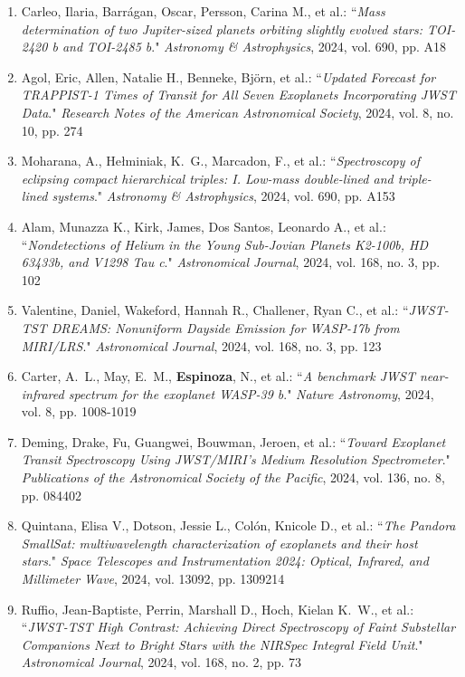 \documentclass[12pt, a4paper]{article} %
\begin{document}
\begin{flushleft}
\begin{enumerate}
\item Carleo, Ilaria, Barrágan, Oscar, Persson, Carina M., et al.: ``\textit{Mass determination of two Jupiter-sized planets orbiting slightly evolved stars: TOI-2420 b and TOI-2485 b}." \textit{Astronomy \& Astrophysics}, 2024, vol. 690, pp. A18
\item Agol, Eric, Allen, Natalie H., Benneke, Björn, et al.: ``\textit{Updated Forecast for TRAPPIST-1 Times of Transit for All Seven Exoplanets Incorporating JWST Data}." \textit{Research Notes of the American Astronomical Society}, 2024, vol. 8, no. 10, pp. 274
\item Moharana, A., Hełminiak, K.~G., Marcadon, F., et al.: ``\textit{Spectroscopy of eclipsing compact hierarchical triples: I. Low-mass double-lined and triple-lined systems}." \textit{Astronomy \& Astrophysics}, 2024, vol. 690, pp. A153
\item Alam, Munazza K., Kirk, James, Dos Santos, Leonardo A., et al.: ``\textit{Nondetections of Helium in the Young Sub-Jovian Planets K2-100b, HD 63433b, and V1298 Tau c}." \textit{Astronomical Journal}, 2024, vol. 168, no. 3, pp. 102
\item Valentine, Daniel, Wakeford, Hannah R., Challener, Ryan C., et al.: ``\textit{JWST-TST DREAMS: Nonuniform Dayside Emission for WASP-17b from MIRI/LRS}." \textit{Astronomical Journal}, 2024, vol. 168, no. 3, pp. 123
\item Carter, A.~L., May, E.~M., \textbf{Espinoza}, N., et al.: ``\textit{A benchmark JWST near-infrared spectrum for the exoplanet WASP-39 b}." \textit{Nature Astronomy}, 2024, vol. 8, pp. 1008-1019
\item Deming, Drake, Fu, Guangwei, Bouwman, Jeroen, et al.: ``\textit{Toward Exoplanet Transit Spectroscopy Using JWST/MIRI's Medium Resolution Spectrometer}." \textit{Publications of the Astronomical Society of the Pacific}, 2024, vol. 136, no. 8, pp. 084402
\item Quintana, Elisa V., Dotson, Jessie L., Colón, Knicole D., et al.: ``\textit{The Pandora SmallSat: multiwavelength characterization of exoplanets and their host stars}." \textit{Space Telescopes and Instrumentation 2024: Optical, Infrared, and Millimeter Wave}, 2024, vol. 13092, pp. 1309214
\item Ruffio, Jean-Baptiste, Perrin, Marshall D., Hoch, Kielan K.~W., et al.: ``\textit{JWST-TST High Contrast: Achieving Direct Spectroscopy of Faint Substellar Companions Next to Bright Stars with the NIRSpec Integral Field Unit}." \textit{Astronomical Journal}, 2024, vol. 168, no. 2, pp. 73

\end{enumerate}
\end{flushleft}
\end{document}
